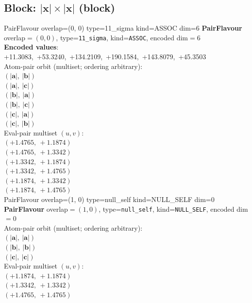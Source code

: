 \documentclass[a4paper,11pt]{article}
\newcommand{\vc}[1]{\ensuremath{\mathbf{#1}}}
\newcommand{\dnfagmiihhiejm}[1]{|\vc{#1}|}
\begin{document}
\subsection{Block: $\dnfagmiihhiejm{x} \times \dnfagmiihhiejm{x}$  (block)}
    PairFlavour  overlap=(0, 0)  type=11\_sigma  kind=ASSOC  dim=6
\textbf{PairFlavour} overlap$=(0, 0)$, type=\texttt{11\_sigma}, kind=\texttt{ASSOC}, encoded dim$=6$\\
\textbf{      Encoded values}: +11.3083,\ +53.3240,\ +134.2109,\ +190.1584,\ +143.8079,\ +45.3503\\
\quad Atom-pair orbit (multiset; ordering arbitrary):\\
$(\dnfagmiihhiejm{a},\ \dnfagmiihhiejm{b})$\\
$(\dnfagmiihhiejm{a},\ \dnfagmiihhiejm{c})$\\
$(\dnfagmiihhiejm{b},\ \dnfagmiihhiejm{a})$\\
$(\dnfagmiihhiejm{b},\ \dnfagmiihhiejm{c})$\\
$(\dnfagmiihhiejm{c},\ \dnfagmiihhiejm{a})$\\
$(\dnfagmiihhiejm{c},\ \dnfagmiihhiejm{b})$\\
\quad Eval-pair multiset $(u, v)$:\\
$(+1.4765,\ +1.1874)$\\
$(+1.4765,\ +1.3342)$\\
$(+1.3342,\ +1.1874)$\\
$(+1.3342,\ +1.4765)$\\
$(+1.1874,\ +1.3342)$\\
$(+1.1874,\ +1.4765)$\\
    PairFlavour  overlap=(1, 0)  type=null\_self  kind=NULL\_SELF  dim=0
\textbf{PairFlavour} overlap$=(1, 0)$, type=\texttt{null\_self}, kind=\texttt{NULL\_SELF}, encoded dim$=0$\\
\quad Atom-pair orbit (multiset; ordering arbitrary):\\
$(\dnfagmiihhiejm{a},\ \dnfagmiihhiejm{a})$\\
$(\dnfagmiihhiejm{b},\ \dnfagmiihhiejm{b})$\\
$(\dnfagmiihhiejm{c},\ \dnfagmiihhiejm{c})$\\
\quad Eval-pair multiset $(u, v)$:\\
$(+1.1874,\ +1.1874)$\\
$(+1.3342,\ +1.3342)$\\
$(+1.4765,\ +1.4765)$\\
\end{document}
